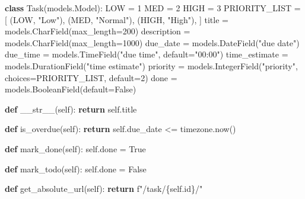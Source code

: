 \documentclass[]{article}
\newenvironment{Shaded}{}{}
\newcommand{\BuiltInTok}[1]{#1}
\newcommand{\ControlFlowTok}[1]{\textcolor[rgb]{0.00,0.44,0.13}{\textbf{#1}}}
\newcommand{\DecValTok}[1]{\textcolor[rgb]{0.25,0.63,0.44}{#1}}
\newcommand{\FunctionTok}[1]{\textcolor[rgb]{0.02,0.16,0.49}{#1}}
\newcommand{\KeywordTok}[1]{\textcolor[rgb]{0.00,0.44,0.13}{\textbf{#1}}}
\newcommand{\NormalTok}[1]{#1}
\newcommand{\OperatorTok}[1]{\textcolor[rgb]{0.40,0.40,0.40}{#1}}
\newcommand{\SpecialCharTok}[1]{\textcolor[rgb]{0.25,0.44,0.63}{#1}}
\newcommand{\SpecialStringTok}[1]{\textcolor[rgb]{0.73,0.40,0.53}{#1}}
\newcommand{\StringTok}[1]{\textcolor[rgb]{0.25,0.44,0.63}{#1}}
\newcommand{\VariableTok}[1]{\textcolor[rgb]{0.10,0.09,0.49}{#1}}
\begin{document}
\begin{Shaded}
\begin{Highlighting}[]
\KeywordTok{class}\NormalTok{ Task(models.Model):}
\NormalTok{    LOW }\OperatorTok{=} \DecValTok{1}
\NormalTok{    MED }\OperatorTok{=} \DecValTok{2}
\NormalTok{    HIGH }\OperatorTok{=} \DecValTok{3}
\NormalTok{    PRIORITY_LIST }\OperatorTok{=}\NormalTok{ [}
\NormalTok{        (LOW, }\StringTok{"Low"}\NormalTok{),}
\NormalTok{        (MED, }\StringTok{"Normal"}\NormalTok{),}
\NormalTok{        (HIGH, }\StringTok{"High"}\NormalTok{),}
\NormalTok{    ]}
\NormalTok{    title }\OperatorTok{=}\NormalTok{ models.CharField(max_length}\OperatorTok{=}\DecValTok{200}\NormalTok{)}
\NormalTok{    description }\OperatorTok{=}\NormalTok{ models.CharField(max_length}\OperatorTok{=}\DecValTok{1000}\NormalTok{)}
\NormalTok{    due_date }\OperatorTok{=}\NormalTok{ models.DateField(}\StringTok{"due date"}\NormalTok{)}
\NormalTok{    due_time }\OperatorTok{=}\NormalTok{ models.TimeField(}\StringTok{"due time"}\NormalTok{, default}\OperatorTok{=}\StringTok{"00:00"}\NormalTok{)}
\NormalTok{    time_estimate }\OperatorTok{=}\NormalTok{ models.DurationField(}\StringTok{"time estimate"}\NormalTok{)}
\NormalTok{    priority }\OperatorTok{=}\NormalTok{ models.IntegerField(}\StringTok{"priority"}\NormalTok{, choices}\OperatorTok{=}\NormalTok{PRIORITY_LIST, default}\OperatorTok{=}\DecValTok{2}\NormalTok{)}
\NormalTok{    done }\OperatorTok{=}\NormalTok{ models.BooleanField(default}\OperatorTok{=}\VariableTok{False}\NormalTok{)}

    \KeywordTok{def} \FunctionTok{__str__}\NormalTok{(}\VariableTok{self}\NormalTok{):}
        \ControlFlowTok{return} \VariableTok{self}\NormalTok{.title}

    \KeywordTok{def}\NormalTok{ is_overdue(}\VariableTok{self}\NormalTok{):}
        \ControlFlowTok{return} \VariableTok{self}\NormalTok{.due_date }\OperatorTok{<=}\NormalTok{ timezone.now()}

    \KeywordTok{def}\NormalTok{ mark_done(}\VariableTok{self}\NormalTok{):}
        \VariableTok{self}\NormalTok{.done }\OperatorTok{=} \VariableTok{True}

    \KeywordTok{def}\NormalTok{ mark_todo(}\VariableTok{self}\NormalTok{):}
        \VariableTok{self}\NormalTok{.done }\OperatorTok{=} \VariableTok{False}

    \KeywordTok{def}\NormalTok{ get_absolute_url(}\VariableTok{self}\NormalTok{):}
        \ControlFlowTok{return} \SpecialStringTok{f"/task/}\SpecialCharTok{\{}\VariableTok{self}\SpecialCharTok{.}\BuiltInTok{id}\SpecialCharTok{\}}\SpecialStringTok{/"}
\end{Highlighting}
\end{Shaded}
\end{document}
